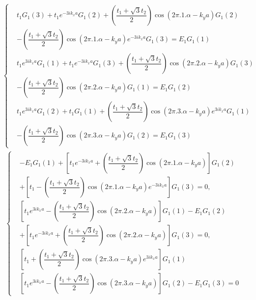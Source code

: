 \documentclass{report}
\newcommand{\f}[2]{\dfrac{#1}{#2}}
\begin{document}
\begin{align*}
	\begin{cases}
		 & t_{1} G_{1}(3) + t_{1} e^{-3i k_x a}G_{1}(2) + \left(\f{t_{1} + \sqrt{3}t_{2}}{2}\right)\cos \left(2\pi .1. \alpha - k_y a\right) G_{1}(2)             \\
		 & - \left(\f{t_{1} + \sqrt{3}t_{2}}{2}\right)\cos \left(2\pi .1. \alpha - k_y a\right) e^{-3i k_x a}G_{1}(3) = E_{1} G_{1}(1)                            \\
		 & t_{1} e^{3i k_x a}G_{1}(1) + t_{1} e^{-3i k_x a}G_{1}(3) + \left(\f{t_{1} + \sqrt{3}t_{2}}{2}\right)\cos \left(2\pi .2. \alpha - k_y a\right) G_{1}(3) \\
		 & - \left(\f{t_{1} + \sqrt{3}t_{2}}{2}\right)\cos \left(2\pi .2. \alpha - k_y a\right) G_{1}(1) = E_{1} G_{1}(2)                                         \\
		 & t_{1} e^{3 i k_x a}G_{1}(2) + t_{1} G_{1}(1) + \left(\f{t_{1} + \sqrt{3}t_{2}}{2}\right)\cos \left(2\pi .3. \alpha - k_y a\right) e^{3i k_x a}G_{1}(1) \\
		 & - \left(\f{t_{1} + \sqrt{3}t_{2}}{2}\right)\cos \left(2\pi .3. \alpha - k_y a\right) G_{1}(2) = E_{1} G_{1}(3)
	\end{cases}
\end{align*}
\begin{align*}
	\begin{cases}
		 & - E_{1} G_{1}(1) + \left[ t_{1} e^{-3i k_x a} + \left(\f{t_{1} + \sqrt{3}t_{2}}{2}\right)\cos \left(2\pi .1. \alpha - k_y a\right)\right] G_{1}(2)  \\
		 & + \left[t_{1} - \left(\f{t_{1} + \sqrt{3}t_{2}}{2}\right)\cos \left(2\pi .1. \alpha - k_y a\right) e^{-3i k_x a}\right] G_{1}(3) = 0 ,              \\
		 & \left[t_{1} e^{3i k_x a} - \left(\f{t_{1} + \sqrt{3}t_{2}}{2}\right)\cos \left(2\pi .2. \alpha - k_y a\right)\right] G_{1}(1) - E_{1} G_{1}(2)      \\
		 & + \left[t_{1} e^{-3i k_x a} + \left(\f{t_{1} + \sqrt{3}t_{2}}{2}\right)\cos \left(2\pi .2. \alpha - k_y a\right)\right] G_{1}(3) = 0    ,           \\
		 & \left[t_{1} + \left(\f{t_{1} + \sqrt{3}t_{2}}{2}\right)\cos \left(2\pi .3. \alpha - k_y a\right) e^{3i k_x a}\right]  G_{1}(1)                      \\
		 & \left[t_{1} e^{3 i k_x a} - \left(\f{t_{1} + \sqrt{3}t_{2}}{2}\right)\cos \left(2\pi .3. \alpha - k_y a\right)\right] G_{1}(2) - E_{1} G_{1}(3) = 0
	\end{cases}
\end{align*}
\end{document}
